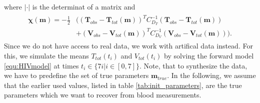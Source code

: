 where $|\cdot|$ is the determinat of a matrix and
\begin{align}
    \begin{split}
        \mathbf{\chi}(\mathbf{m}) = -\frac{1}{2}&\bigr((\mathbf{T}_{obs} - \mathbf{T}_{tot}(\mathbf{m}))^T C_{D_T}^{-1}(\mathbf{T}_{obs} - \mathbf{T}_{tot}(\mathbf{m})) 
        \\&+ (\mathbf{V}_{obs} - \mathbf{V}_{tot}(\mathbf{m}))^T C_{D_V}^{-1}(\mathbf{V}_{obs} - \mathbf{V}_{tot}(\mathbf{m}))\bigl).
    \end{split}
    \label{equ:prior_D_exp}
\end{align}
Since we do not have access to real data, we work with artifical data instead.
For this, we simulate the means $T_{tot}(t_i)$ and $V_{tot}(t_i)$ by solving the forward model \ref{equ:HIVmodel} at times $t_i \in \{7i|i \in [0,7]\}$.
Note, that to synthesize the data, we have to predefine the set of true parameters $\mathbf{m}_{true}$.
In the following, we assume that the earlier used values, listed in table \ref{tab:init_parameters}, are the true parameters which we want to recover from blood measurements.
